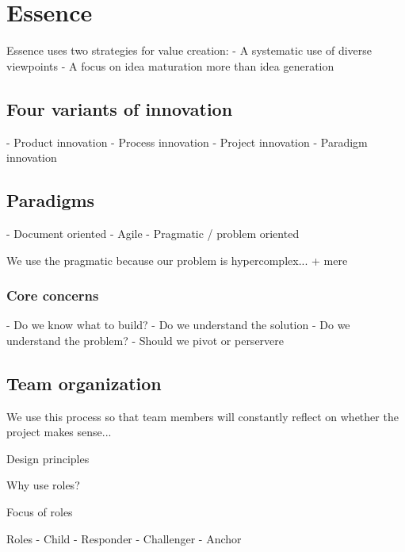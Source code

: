 \section{Essence}

Essence uses two strategies for value creation:
- A systematic use of diverse viewpoints
- A focus on idea maturation more than idea generation

\subsection{Four variants of innovation}

- Product innovation
- Process innovation
- Project innovation
- Paradigm innovation

\subsection{Paradigms}

- Document oriented
- Agile 
- Pragmatic / problem oriented

We use the pragmatic because our problem is hypercomplex... + mere

\subsubsection{Core concerns}

- Do we know what to build?
- Do we understand the solution
- Do we understand the problem?
- Should we pivot or perservere

\subsection{Team organization}
We use this process so that team members will constantly reflect on whether the project makes sense...

Design principles

Why use roles?

Focus of roles

Roles
- Child
- Responder
- Challenger
- Anchor